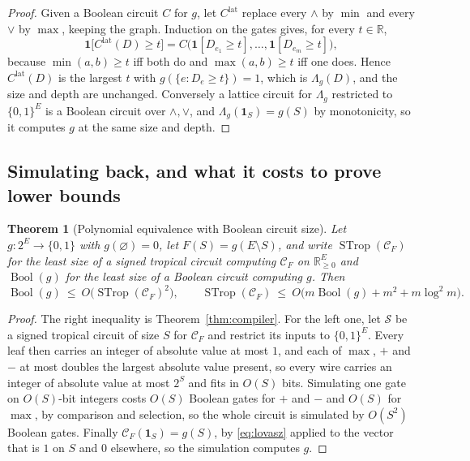 \documentclass[11pt]{article}
\newtheorem{theorem}{Theorem}[section]
\begin{document}
\begin{proof}
Given a Boolean circuit $C$ for $g$, let $C^{\mathrm{lat}}$ replace every
$\wedge$ by $\min$ and every $\vee$ by $\max$, keeping the graph.  Induction on
the gates gives, for every $t\in\mathbb R$,
\[
  \mathbf1\bigl[C^{\mathrm{lat}}(D)\ge t\bigr]
  =C\bigl(\mathbf1[D_{e_1}\ge t],\ldots,\mathbf1[D_{e_m}\ge t]\bigr),
\]
because $\min(a,b)\ge t$ iff both do and $\max(a,b)\ge t$ iff one does.  Hence
$C^{\mathrm{lat}}(D)$ is the largest $t$ with $g(\{e:D_e\ge t\})=1$, which is
$\Lambda_g(D)$, and the size and depth are unchanged.  Conversely a lattice
circuit for $\Lambda_g$ restricted to $\{0,1\}^{E}$ is a Boolean circuit over
$\wedge,\vee$, and $\Lambda_g(\mathbf1_S)=g(S)$ by monotonicity, so it computes
$g$ at the same size and depth.
\end{proof}

\subsection{Simulating back, and what it costs to prove lower bounds}
\label{sec:reverse}

\begin{theorem}[Polynomial equivalence with Boolean circuit size]
\label{thm:equivalence}
Let $g\colon2^{E}\to\{0,1\}$ with $g(\varnothing)=0$, let $F(S)=g(E\setminus S)$,
and write $\operatorname{STrop}(\mathcal C_F)$ for the least size of a signed
tropical circuit computing $\mathcal C_F$ on $\mathbb R_{\ge0}^{E}$ and
$\operatorname{Bool}(g)$ for the least size of a Boolean circuit computing $g$.
Then
\begin{equation}
  \operatorname{Bool}(g)\ \le\ O\bigl(\operatorname{STrop}(\mathcal C_F)^{2}\bigr),
  \qquad
  \operatorname{STrop}(\mathcal C_F)\ \le\ O\bigl(m\operatorname{Bool}(g)+m^{2}+m\log^{2}m\bigr).
  \label{eq:equivalence}
\end{equation}
\end{theorem}

\begin{proof}
The right inequality is Theorem~\ref{thm:compiler}.  For the left one, let
$\mathcal S$ be a signed tropical circuit of size $S$ for $\mathcal C_F$ and
restrict its inputs to $\{0,1\}^{E}$.  Every leaf then carries an integer of
absolute value at most $1$, and each of $\max$, $+$ and $-$ at most doubles the
largest absolute value present, so every wire carries an integer of absolute
value at most $2^{S}$ and fits in $O(S)$ bits.  Simulating one gate on $O(S)$-bit
integers costs $O(S)$ Boolean gates for $+$ and $-$ and $O(S)$ for $\max$, by
comparison and selection, so the whole circuit is simulated by $O(S^{2})$ Boolean
gates.  Finally $\mathcal C_F(\mathbf1_S)=g(S)$, by \eqref{eq:lovasz} applied to
the vector that is $1$ on $S$ and $0$ elsewhere, so the simulation computes $g$.
\end{proof}
\end{document}
